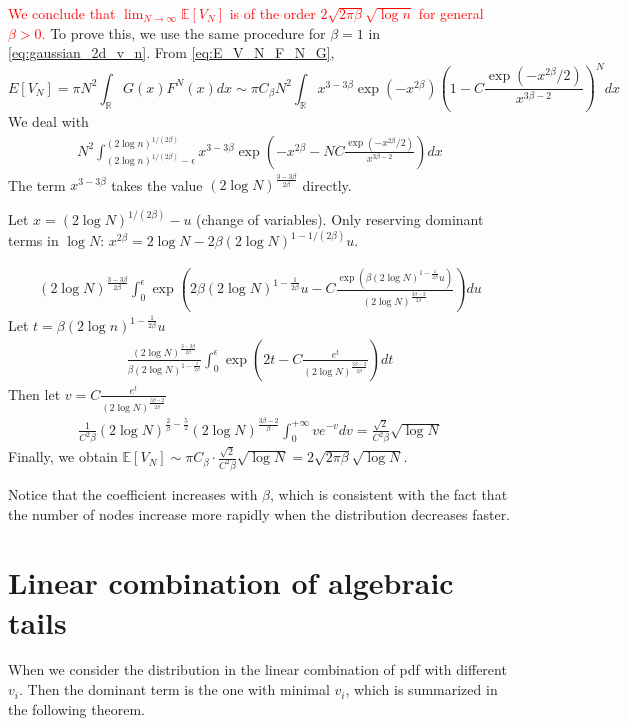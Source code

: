 \documentclass{article}
\def\E{\mathbb{E}}
\def\R{\mathbb{R}}
\begin{document}
\textcolor{red}{We conclude that
$\lim_{N\to \infty} \E[V_N]$
is of the order $ 2\sqrt{2\pi \beta} \sqrt{\log n}
$ for general $\beta>0$.}
To prove this, we use the same procedure for $\beta=1$
in \eqref{eq:gaussian_2d_v_n}.
From \eqref{eq:E_V_N_F_N_G},
$$
E[V_N] = \pi N^2\int_{\R}G(x)F^N(x)
dx\sim \pi C_\beta
N^2 \int_{\R}
x^{3-3\beta} \exp(-x^{2\beta}) \left(
1-C\frac{\exp(-x^{2\beta}/2)}{x^{3\beta-2}}
\right)^N dx
$$
We deal with 
\begin{align*}
    N^2 \int_{(2\log n)^{1/(2\beta)}-\epsilon}^{(2\log n)^{1/(2\beta)}}
    x^{3-3\beta}\exp\left(
    -x^{2\beta} -N
    C\frac{\exp(-x^{2\beta}/2)}{x^{3\beta-2}}
 \right) dx
\end{align*}
The term $x^{3-3\beta}$ takes the value
$(2\log N)^{\frac{3-3\beta}{2\beta}}$ directly.

Let $x=(2\log N)^{1/(2\beta)}-u$ (change of variables).
Only reserving dominant terms in $\log N$:
$
x^{2\beta} = 2\log N - 
2\beta
(2 \log N)^{1-1/(2\beta)}u$.

\begin{align*}
    (2\log N)^{\frac{3-3\beta}{2\beta}}
    \int_{0}^{\epsilon}
\exp\left(
    2\beta (2\log N)^{1-\frac{1}{2\beta}} u -
    C\frac{\exp(\beta (2\log N)^{1-\frac{1}{2\beta}} u)}{(2\log N)^{\frac{3\beta-2}{2\beta}}}
 \right) du
\end{align*}
Let $t=\beta (2\log n)^{1-\frac{1}{2\beta}}u$
\begin{align*}
    \frac{(2\log N)^{\frac{3-3\beta}{2\beta}}
    }{\beta(2\log N)^{1-\frac{1}{2\beta}}}
    \int_{0}^{\epsilon}
\exp\left(
    2t -
    C\frac{e^t}{(2\log N)^{\frac{3\beta-2}{2\beta}}}
 \right) dt
\end{align*}
Then let $v=C\frac{e^t}{(2\log N)^{\frac{3 \beta - 2}{2\beta}}}$
\begin{align*}
   \frac{1}{C^2\beta} (2\log N)^{\frac{2}{\beta} - \frac{5}{2}}
    (2\log N)^{\frac{3 \beta - 2}{\beta}}
    \int_{0}^{+\infty}
ve^{-v}dv
= \frac{\sqrt{2}}{C^2\beta}
\sqrt{\log N}
\end{align*}
Finally, we obtain $\E[V_N] 
\sim \pi C_{\beta} \cdot \frac{\sqrt{2}}{C^2\beta} \sqrt{\log N}
 = 2\sqrt{2\pi \beta} \sqrt{\log N}$.

Notice that the coefficient increases with $\beta$,
which is consistent with the fact that the number of nodes increase
more rapidly 
when the distribution decreases faster.

\section{Linear combination of algebraic tails}
When we consider the distribution in the linear combination
of pdf with different $v_i$.
Then the dominant term is the one with minimal $v_i$,
which is summarized in the following theorem.
\end{document}
